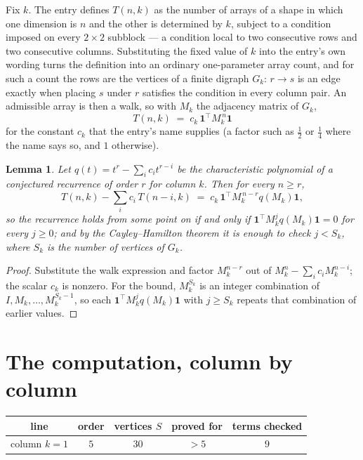 \documentclass[11pt,a4paper]{article}
\theoremstyle{plain}
\newtheorem{lemma}[theorem]{Lemma}
\theoremstyle{definition}
\begin{document}
Fix $k$. The entry defines $T(n,k)$ as the number of arrays of a shape in which one dimension
is $n$ and the other is determined by $k$, subject to a condition imposed on every
$2\times2$ subblock --- a condition local to two consecutive rows and two consecutive columns.
Substituting the fixed value of $k$ into the entry's own wording turns the definition into an
ordinary one-parameter array count, and for such a count the rows are the vertices of a finite
digraph $G_k$: $r\to s$ is an edge exactly when placing $s$ under $r$ satisfies the condition
in every column pair. An admissible array is then a walk, so with $M_k$ the adjacency matrix
of $G_k$,
\[
T(n,k)\;=\;c_k\,\mathbf{1}^{\!\top}M_k^{\,n}\mathbf{1}
\]
for the constant $c_k$ that the entry's name supplies (a factor such as $\tfrac12$ or
$\tfrac14$ where the name says so, and $1$ otherwise).

\begin{lemma}\label{lem:crit}
Let $q(t)=t^{r}-\sum_i c_it^{r-i}$ be the characteristic polynomial of a conjectured
recurrence of order $r$ for column $k$. Then for every $n\ge r$,
\[
T(n,k)-\sum_i c_i\,T(n-i,k)\;=\;c_k\,\mathbf{1}^{\!\top}M_k^{\,n-r}q(M_k)\mathbf{1},
\]
so the recurrence holds from some point on if and only if
$\mathbf{1}^{\!\top}M_k^{j}q(M_k)\mathbf{1}=0$ for every $j\ge0$; and by the
Cayley--Hamilton theorem it is enough to check $j<S_k$, where $S_k$ is the number of vertices
of $G_k$.
\end{lemma}

\begin{proof}
Substitute the walk expression and factor $M_k^{n-r}$ out of $M_k^{n}-\sum_ic_iM_k^{n-i}$;
the scalar $c_k$ is nonzero. For the bound, $M_k^{S_k}$ is an integer combination of
$I,M_k,\dots,M_k^{S_k-1}$, so each $\mathbf{1}^{\!\top}M_k^{j}q(M_k)\mathbf{1}$ with
$j\ge S_k$ repeats that combination of earlier values.
\end{proof}

\section{The computation, column by column}

\begin{center}
\begin{tabular}{ccccc}
line & order & vertices $S$ & proved for & terms checked \\ \hline
column $k$$=1$ & $5$ & $30$ & $>5$ & $9$ \\
\end{tabular}
\end{center}
\end{document}

